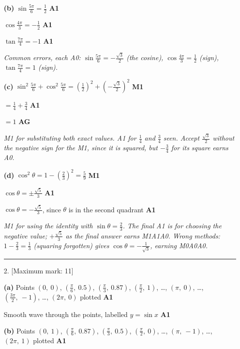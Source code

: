 \documentclass[12pt, twoside]{article}
\begin{document}
\begin{enumerate}[itemsep=0.3cm]
\textbf{(b)} $\sin\frac{5\pi}{6} = \frac{1}{2}$ \hfill \textbf{A1}

$\cos\frac{4\pi}{3} = -\frac{1}{2}$ \hfill \textbf{A1}

$\tan\frac{7\pi}{4} = -1$ \hfill \textbf{A1}

\emph{Common errors, each A0: $\sin\frac{5\pi}{6} = -\frac{\sqrt{3}}{2}$
(the cosine), $\cos\frac{4\pi}{3} = \frac{1}{2}$ (sign), $\tan\frac{7\pi}{4}
= 1$ (sign).}

\textbf{(c)} $\sin^{2}\frac{5\pi}{6} + \cos^{2}\frac{5\pi}{6}
= \left(\frac{1}{2}\right)^{2} + \left(-\frac{\sqrt{3}}{2}\right)^{2}$
\hfill \textbf{M1}

$= \frac{1}{4} + \frac{3}{4}$ \hfill \textbf{A1}

$= 1$ \hfill \textbf{AG}

\emph{M1 for substituting both exact values. A1 for $\frac{1}{4}$ and
$\frac{3}{4}$ seen. Accept $\frac{\sqrt{3}}{2}$ without the negative
sign for the M1, since it is squared, but $-\frac{3}{4}$ for its square
earns A0.}

\textbf{(d)} $\cos^{2}\theta = 1 - \left(\frac{2}{3}\right)^{2}
= \frac{5}{9}$ \hfill \textbf{M1}

$\cos\theta = \pm\frac{\sqrt{5}}{3}$ \hfill \textbf{A1}

$\cos\theta = -\frac{\sqrt{5}}{3}$, since $\theta$ is in the second quadrant
\hfill \textbf{A1}

\emph{M1 for using the identity with $\sin\theta = \frac{2}{3}$. The final
A1 is for choosing the negative value; $+\frac{\sqrt{5}}{3}$ as the final
answer earns M1A1A0. Wrong methods: $1 - \frac{2}{3} = \frac{1}{3}$
(squaring forgotten) gives $\cos\theta = -\frac{1}{\sqrt{3}}$, earning
M0A0A0.}

\bigskip \hrule \bigskip

\item[2.] [Maximum mark: 11]

\textbf{(a)} Points $(0,\ 0)$, $\left(\frac{\pi}{6},\ 0.5\right)$,
$\left(\frac{\pi}{3},\ 0.87\right)$, $\left(\frac{\pi}{2},\ 1\right)$,
\ldots, $(\pi,\ 0)$, \ldots, $\left(\frac{3\pi}{2},\ -1\right)$, \ldots,
$(2\pi,\ 0)$ plotted \hfill \textbf{A1}

Smooth wave through the points, labelled $y = \sin x$ \hfill \textbf{A1}

\textbf{(b)} Points $(0,\ 1)$, $\left(\frac{\pi}{6},\ 0.87\right)$,
$\left(\frac{\pi}{3},\ 0.5\right)$, $\left(\frac{\pi}{2},\ 0\right)$,
\ldots, $(\pi,\ -1)$, \ldots, $(2\pi,\ 1)$ plotted \hfill \textbf{A1}


\end{enumerate}
\end{document}
